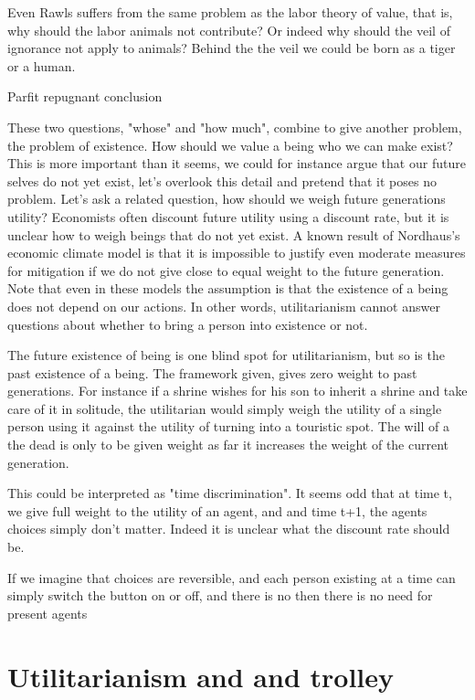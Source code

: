 Even Rawls suffers from the same problem as the labor theory of value, that is, why should the labor animals not contribute? Or indeed why should the veil of ignorance not apply to animals? Behind the the veil we could be born as a tiger or a human. 

Parfit repugnant conclusion

These two questions, "whose" and "how much", combine to give another problem, the problem of existence. How should we value a being who we can make exist? This is more important than it seems, we could for instance argue that our future selves do not yet exist, let's overlook this detail and pretend that it poses no problem. Let's ask a related question, how should we weigh future generations utility? Economists often discount future utility using a discount rate, but it is unclear how to weigh beings that do not yet exist. A known result of Nordhaus's economic climate model is that it is impossible to justify even moderate measures for mitigation if we do not give close to equal weight to the future generation. Note that even in these models the assumption is that the existence of a being does not depend on our actions. In other words, utilitarianism cannot answer questions about whether to bring a person into existence or not.

The future existence of being is one blind spot for utilitarianism, but so is the past existence of a being. The framework given, gives zero weight to past generations. For instance if a shrine wishes for his son to inherit a shrine and take care of it in solitude, the utilitarian would simply weigh the utility of a single person using it against the utility of turning into a touristic spot. The will of a the dead is only to be given weight as far it increases the weight of the current generation. 

This could be interpreted as "time discrimination". It seems odd that at time t, we give full weight to the utility of an agent, and and time t+1, the agents choices simply don't matter. Indeed it is unclear what the discount rate should be. 

If we imagine that choices are reversible, and each person existing at a time can simply switch the button on or off, and there is no then there is no need for present agents 


\section{Utilitarianism and and trolley}

